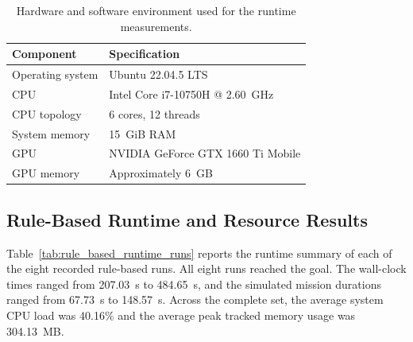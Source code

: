 \begin{table}[tbp]
    \caption{Hardware and software environment used for the runtime measurements.}
    \label{tab:runtime_hardware_summary}
    \centering
    \small
    \setlength{\tabcolsep}{5pt}
    \renewcommand{\arraystretch}{1.12}
    \begin{tabular}{@{}ll@{}}
        \toprule
        \textbf{Component} & \textbf{Specification} \\
        \midrule
        Operating system & Ubuntu 22.04.5 LTS \\
        CPU & Intel Core i7-10750H @ 2.60~GHz \\
        CPU topology & 6 cores, 12 threads \\
        System memory & 15~GiB RAM \\
        GPU & NVIDIA GeForce GTX 1660 Ti Mobile \\
        GPU memory & Approximately 6~GB \\
        \bottomrule
    \end{tabular}
\end{table}

\subsection{Rule-Based Runtime and Resource Results}

Table~\ref{tab:rule_based_runtime_runs} reports the runtime summary of each of the eight recorded rule-based runs. All eight runs reached the goal. The wall-clock times ranged from 207.03~s to 484.65~s, and the simulated mission durations ranged from 67.73~s to 148.57~s. Across the complete set, the average system CPU load was 40.16\% and the average peak tracked memory usage was 304.13~MB.

